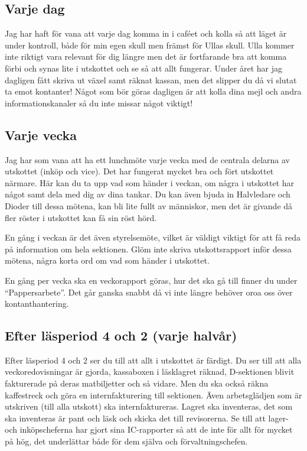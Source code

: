 \documentclass[10pt]{article}
\begin{document}
\subsection{Varje dag}
Jag har haft för vana att varje dag komma in i caféet och kolla så att läget är under kontroll, både för min egen skull men främst för Ullas skull. Ulla kommer inte riktigt vara relevant för dig längre men det är fortfarande bra att komma förbi och synas lite i utskottet och se så att allt fungerar. Under året har jag dagligen fått skriva ut växel samt räknat kassan, men det slipper du då vi slutat ta emot kontanter! Något som bör göras dagligen är att kolla dina mejl och andra informationskanaler så du inte missar något viktigt!

\subsection{Varje vecka}
Jag har som vana att ha ett lunchmöte varje vecka med de centrala delarna av utskottet (inköp och vice). Det har fungerat mycket bra och fört utskottet närmare. Här kan du ta upp vad som händer i veckan, om några i utskottet har något samt dela med dig av dina tankar. Du kan även bjuda in Halvledare och Dioder till dessa mötena, kan bli lite fullt av människor, men det är givande då fler röster i utskottet kan få sin röst hörd.

En gång i veckan är det även styrelsemöte, vilket är väldigt viktigt för att få reda på information om hela sektionen. Glöm inte skriva utskottsrapport inför dessa mötena, några korta ord om vad som händer i utskottet.

En gång per vecka ska en veckorapport göras, hur det ska gå till finner du under ``Pappersarbete''. Det går ganska snabbt då vi inte längre behöver oroa oss över kontanthantering.

\subsection{Efter läsperiod 4 och 2 (varje halvår)}
Efter läsperiod 4 och 2 ser du till att allt i utskottet är färdigt. Du ser till att alla veckoredovisningar är gjorda, kassaboxen i läsklagret räknad, D-sektionen blivit fakturerade på deras matbiljetter och så vidare. Men du ska också räkna kaffestreck och göra en internfakturering till sektionen. Även arbetsglädjen som är utskriven (till alla utskott) ska internfaktureras. Lagret ska inventeras, det som ska inventeras är pant och läsk och skicka det till revisorerna. Se till att lager- och inköpscheferna har gjort sina IC-rapporter så att de inte för allt för mycket på hög, det underlättar både för dem själva och förvaltningschefen.
\end{document}
